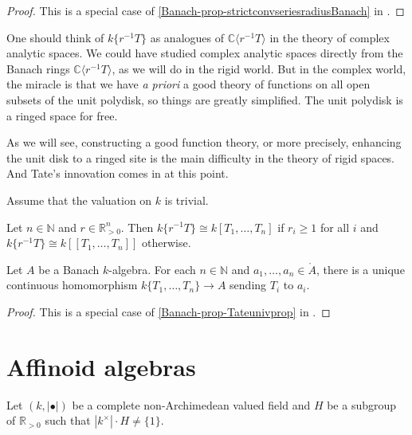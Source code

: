 \begin{proof}
    This is a special case of \cref{Banach-prop-strictconvseriesradiusBanach} in .
\end{proof}


\begin{remark}
One should think of $k\{r^{-1}T\}$ as analogues of $\mathbb{C}\langle r^{-1}T\rangle$ in the theory of complex analytic spaces.  We could have studied complex analytic spaces directly from the Banach rings $\mathbb{C}\langle r^{-1}T\rangle$, as we will do in the rigid world. But in the complex world, the miracle is that we have \emph{a priori} a good theory of functions on all open subsets of the unit polydisk, so things are greatly simplified. The unit polydisk is a ringed space for free.

As we will see, constructing a good function theory, or more precisely, enhancing the unit disk to a ringed site is the main difficulty in the theory of rigid spaces. And Tate's innovation comes in at this point.
\end{remark}

\begin{example}\label{ex-trivvaluedaff}
    Assume that the valuation on $k$ is trivial. 

    Let $n\in \mathbb{N}$ and $r\in \mathbb{R}^n_{>0}$. 
    Then $k\{r^{-1}T\}\cong k[T_1,\ldots,T_n]$ if $r_i\geq 1$ for all $i$ and $k\{r^{-1}T\}\cong k[[T_1,\ldots,T_n]]$ otherwise.
\end{example}

\begin{lemma}\label{lma-Tatestrictuniv}
    Let $A$ be a Banach $k$-algebra. For each $n\in \mathbb{N}$ and $a_1,\ldots,a_n\in \mathring{A}$, there is a unique continuous homomorphism $k\{T_1,\ldots,T_n\}\rightarrow A$ sending $T_i$ to $a_i$.
\end{lemma}
\begin{proof}
    This is a special case of \cref{Banach-prop-Tateunivprop} in .
\end{proof}





\section{Affinoid algebras}
Let $(k,|\bullet|)$ be a complete non-Archimedean valued field and $H$ be a subgroup of $\mathbb{R}_{>0}$ such that $|k^{\times}|\cdot H\neq \{1\}$.
 
